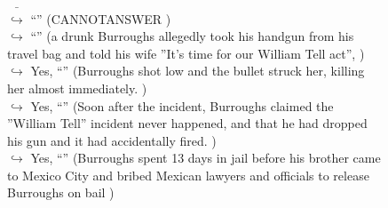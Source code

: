 \documentclass[11pt,a4paper, onecolumn]{article}
\begin{document}
\begin{figure}[t] \small \begin{tcolorbox}[boxsep=0pt,left=5pt,right=0pt,top=2pt,colback = yellow!5] \begin{dialogue}
 \small 
\colorbox{pink!25}{ $\bar{\hookrightarrow}$}
{ ``'' (CANNOTANSWER ) }
\\
\colorbox{pink!25}{$\hookrightarrow$}
{ ``'' (a drunk Burroughs allegedly took his handgun from his travel bag and told his wife ''It's time for our William Tell act'', ) }
\\
\colorbox{pink!25}{$\hookrightarrow$}
\colorbox{red!25}{Yes,}
{ ``'' (Burroughs shot low and the bullet struck her, killing her almost immediately. ) }
\\
\colorbox{pink!25}{$\hookrightarrow$}
\colorbox{red!25}{Yes,}
{ ``'' (Soon after the incident, Burroughs claimed the ''William Tell'' incident never happened, and that he had dropped his gun and it had accidentally fired. ) }
\\
\colorbox{pink!25}{$\hookrightarrow$}
\colorbox{red!25}{Yes,}
{ ``'' (Burroughs spent 13 days in jail before his brother came to Mexico City and bribed Mexican lawyers and officials to release Burroughs on bail ) }
\\
 \end{dialogue}\end{tcolorbox}\end{figure}
\end{document}
